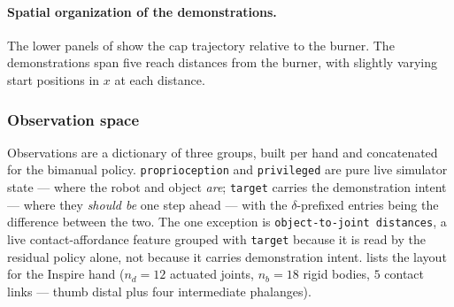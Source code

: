 \paragraph{Spatial organization of the demonstrations.}
The lower panels of  show the cap trajectory relative to the burner. The demonstrations span five reach distances from the burner, with slightly varying start positions in $x$ at each distance.

 
\subsubsection{Observation space}

Observations are a dictionary of three groups, built per hand and concatenated for the bimanual
policy. \texttt{proprioception} and \texttt{privileged} are pure live simulator state --- where the
robot and object \emph{are}; \texttt{target} carries the demonstration intent --- where they
\emph{should be} one step ahead --- with the $\delta$-prefixed entries being the difference between
the two. The one exception is \texttt{object-to-joint distances}, a live contact-affordance feature
grouped with \texttt{target} because it is read by the residual policy alone, not because it carries
demonstration intent.  lists the layout for the Inspire hand ($n_d = 12$
actuated joints, $n_b = 18$ rigid bodies, $5$ contact links --- thumb distal plus four intermediate
phalanges).
